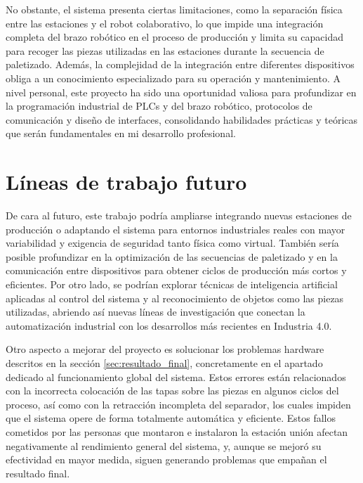 No obstante, el sistema presenta ciertas limitaciones, como la separación física entre las estaciones y el robot colaborativo, lo que impide una integración completa del brazo robótico en el proceso de producción y limita su capacidad para recoger las piezas utilizadas en las estaciones durante la secuencia de paletizado. Además, la complejidad de la integración entre diferentes dispositivos obliga a un conocimiento especializado para su operación y mantenimiento. A nivel personal, este proyecto ha sido una oportunidad valiosa para profundizar en la programación industrial de PLCs y del brazo robótico, protocolos de comunicación y diseño de interfaces, consolidando habilidades prácticas y teóricas que serán fundamentales en mi desarrollo profesional.

\section{Líneas de trabajo futuro}

De cara al futuro, este trabajo podría ampliarse integrando nuevas estaciones de producción o adaptando el sistema para entornos industriales reales con mayor variabilidad y exigencia de seguridad tanto física como virtual. También sería posible profundizar en la optimización de las secuencias de paletizado y en la comunicación entre dispositivos para obtener ciclos de producción más cortos y eficientes. Por otro lado, se podrían explorar técnicas de inteligencia artificial aplicadas al control del sistema y al reconocimiento de objetos como las piezas utilizadas, abriendo así nuevas líneas de investigación que conectan la automatización industrial con los desarrollos más recientes en Industria 4.0.

Otro aspecto a mejorar del proyecto es solucionar los problemas hardware descritos en la sección \ref{sec:resultado_final}, concretamente en el apartado dedicado al funcionamiento global del sistema. Estos errores están relacionados con la incorrecta colocación de las tapas sobre las piezas en algunos ciclos del proceso, así como con la retracción incompleta del separador, los cuales  impiden que el sistema opere de forma totalmente automática y eficiente. Estos fallos cometidos por las personas que montaron e instalaron la estación unión afectan negativamente al rendimiento general del sistema, y, aunque se mejoró su efectividad en mayor medida, siguen generando problemas que empañan el resultado final.
